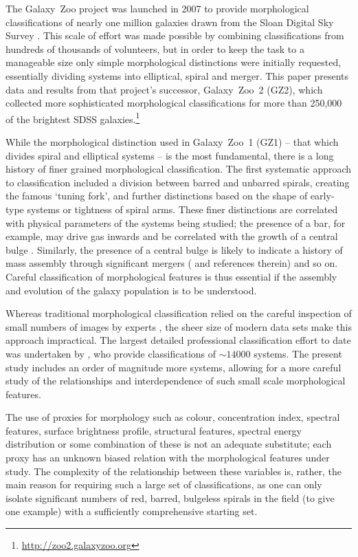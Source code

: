 \documentclass[useAMS,usenatbib]{mn2e}
\begin{document}
The Galaxy~Zoo project \citep{lin08} was launched in 2007 to provide morphological classifications of nearly one million galaxies drawn from the Sloan Digital Sky Survey \citep{yor00}. This scale of effort was made possible by combining classifications from hundreds of thousands of volunteers, but in order to keep the task to a manageable size only simple morphological distinctions were initially requested, essentially dividing systems into elliptical, spiral and merger. This paper presents data and results from that project's successor, Galaxy~Zoo~2 (GZ2), which collected more sophisticated morphological classifications for more than 250,000 of the brightest SDSS galaxies.\footnote{\url{http://zoo2.galaxyzoo.org}}

While the morphological distinction used in Galaxy~Zoo~1 (GZ1) -- that which divides spiral and elliptical systems -- is the most fundamental, there is a long history of finer grained morphological classification. The first systematic approach to classification \citep{hub36} included a division between barred and unbarred spirals, creating the famous `tuning fork', and further distinctions based on the shape of early-type systems or tightness of spiral arms. These finer distinctions are correlated with physical parameters of the systems being studied; the presence of a bar, for example, may drive gas inwards and be correlated with the growth of a central bulge \citep[a review is given in \citet{kor04} and an updated picture by][]{mas11c}. Similarly, the presence of a central bulge is likely to indicate a history of mass assembly through significant mergers (\citet{mar12} and references therein) and so on. Careful classification of morphological features is thus essential if the assembly and evolution of the galaxy population is to be understood.

Whereas traditional morphological classification relied on the careful inspection of small numbers of images by experts \citep[e.g., ][]{san61,dev91}, the sheer size of modern data sets make this approach impractical. The largest detailed professional classification effort to date was undertaken by \citet{nai10}, who provide classifications of $\sim14000$ systems. The present study includes an order of magnitude more systems, allowing for a more careful study of the relationships and interdependence of such small scale morphological features. 

The use of proxies for morphology such as colour, concentration index, spectral features, surface brightness profile, structural features, spectral energy distribution or some combination of these is not an adequate substitute; each proxy has an unknown biased relation with the morphological features under study. The complexity of the relationship between these variables is, rather, the main reason for requiring such a large set of classifications, as one can only isolate significant numbers of red, barred, bulgeless spirals in the field (to give one example) with a sufficiently comprehensive starting set. 
\end{document}
